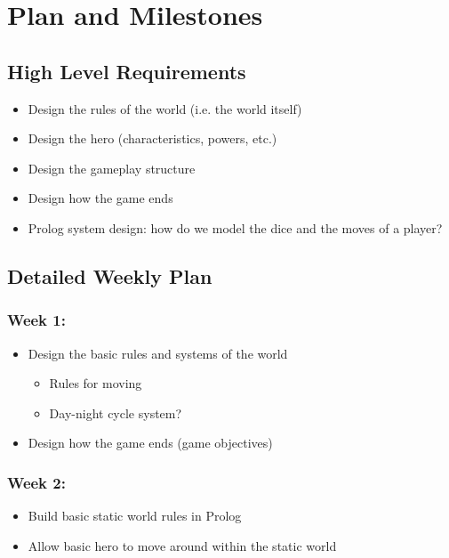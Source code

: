 \documentclass[10pt]{article}
\begin{document}
\section{Plan and Milestones}

\subsection{High Level Requirements}

\begin{itemize}
\item Design the rules of the world (i.e. the world itself)
\item Design the hero (characteristics, powers, etc.)
\item Design the gameplay structure
\item Design how the game ends
\item Prolog system design: how do we model the dice and the moves of a player?
\end{itemize}

\subsection{Detailed Weekly Plan}

\subsubsection*{Week 1:}

\begin{itemize}
\item Design the basic rules and systems of the world
    \begin{itemize}
    \item Rules for moving
    \item Day-night cycle system?
    \end{itemize}
\item Design how the game ends (game objectives)
\end{itemize}


\subsubsection*{Week 2:}

\begin{itemize}
\item Build basic static world rules in Prolog
\item Allow basic hero to move around within the static world
\end{itemize}
\end{document}
